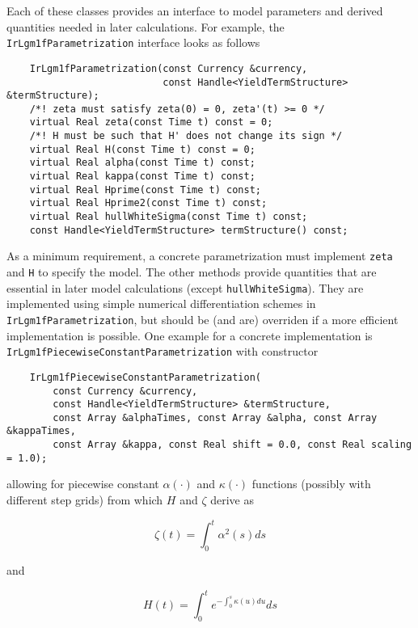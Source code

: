 \documentclass[12pt, a4paper]{article}
\begin{document}
Each of these classes provides an interface to model parameters and derived quantities needed in later calculations. For example, the \verb+IrLgm1fParametrization+ interface looks as follows

\medskip
\scriptsize
\begin{verbatim}
    IrLgm1fParametrization(const Currency &currency,
                           const Handle<YieldTermStructure> &termStructure);
    /*! zeta must satisfy zeta(0) = 0, zeta'(t) >= 0 */
    virtual Real zeta(const Time t) const = 0;
    /*! H must be such that H' does not change its sign */
    virtual Real H(const Time t) const = 0;
    virtual Real alpha(const Time t) const;
    virtual Real kappa(const Time t) const;
    virtual Real Hprime(const Time t) const;
    virtual Real Hprime2(const Time t) const;
    virtual Real hullWhiteSigma(const Time t) const;
    const Handle<YieldTermStructure> termStructure() const;
\end{verbatim}
\normalsize
\medskip

As a minimum requirement, a concrete parametrization must implement \verb+zeta+ and \verb+H+ to specify the model. The other methods provide quantities that are essential in later model calculations (except \verb+hullWhiteSigma+). They are implemented using simple numerical differentiation schemes in \verb+IrLgm1fParametrization+, but should be (and are) overriden if a more efficient implementation is possible. One example for a concrete implementation is \verb+IrLgm1fPiecewiseConstantParametrization+ with constructor

\medskip
\scriptsize
\begin{verbatim}
    IrLgm1fPiecewiseConstantParametrization(
        const Currency &currency,
        const Handle<YieldTermStructure> &termStructure,
        const Array &alphaTimes, const Array &alpha, const Array &kappaTimes,
        const Array &kappa, const Real shift = 0.0, const Real scaling = 1.0);
\end{verbatim}
\normalsize
\medskip

allowing for piecewise constant $\alpha(\cdot)$ and $\kappa(\cdot)$ functions (possibly with different step grids) from which $H$ and $\zeta$ derive as

\begin{equation}
\zeta(t) = \int_0^t \alpha^2(s) ds
\end{equation}

and

\begin{equation}
H(t) = \int_0^t e^{-\int_0^s \kappa(u) du} ds
\end{equation}
\end{document}
